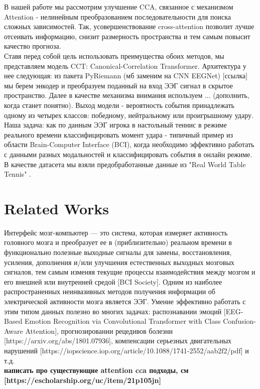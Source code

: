 \documentclass[a4paper,14pt]{article}
\theoremstyle{plain} %
\theoremstyle{definition} %
\theoremstyle{remark} %
\begin{document}
        В нашей работе мы рассмотрим улучшение CCA, связанное с механизмом Attention - нелинейным преобразованием последовательности для поиска сложных зависимостей. Так, усовершенствование cross-attention позволит лучше отсеивать информацию, снизит размерность пространства и тем самым повысит качество прогноза. \\
        Ставя перед собой цель использовать преимущества обоих методов, мы представляем модель CCT: Canonical-Correlation Transformer. Архитектура у нее следующая: из пакета PyRiemann (мб заменим на CNN EEGNet) [ссылка] мы берем энкодер и преобразуем поданный на вход ЭЭГ сигнал в скрытое пространство. Далее в качестве механизма внимания используем ... (дополнить, когда станет понятно). Выход модели - вероятность события принадлежать одному из четырех классов: победному, нейтральному или проигрышному удару. \\    
        Наша задача: как по данным ЭЭГ игрока в настольный теннис в режиме реального времени классифицировать момент удара - типичный пример из области Brain-Computer Interface (BCI), когда необходимо эффективно работать с данными разных модальностей и классифицировать события в онлайн режиме. В качестве датасета мы взяли предобработанные данные из "Real World Table Tennis" \cite{amanda2024dataset}.\\

        \section{Related Works}
        Интерфейс мозг-компьютер — это система, которая измеряет активность головного мозга и преобразует ее в (приблизительно) реальном времени в функционально полезные выходные сигналы для замены, восстановления, усиления, дополнения и/или улучшения естественных выходных мозговых сигналов, тем самым изменяя текущие процессы взаимодействия между мозгом и его внешней или внутренней средой [BCI Society]. Одним из наиболее распространенных неинвазивных методов получения информации об электрической активности мозга является ЭЭГ. Умение эффективно работать с этим типом данных полезно во многих задачах: распознавании эмоций [EEG-Based Emotion Recognition via Convolutional Transformer with Class Confusion-Aware Attention], прогнозировании рецедивов болезни [https://arxiv.org/abs/1801.07936], компенсации серьезных двигательных нарушений [https://iopscience.iop.org/article/10.1088/1741-2552/aab2f2/pdf] и т.д. \\
        \textbf{написать про существующие attention cca подходы, см [https://escholarship.org/uc/item/21p105jn]}        
\end{document}
